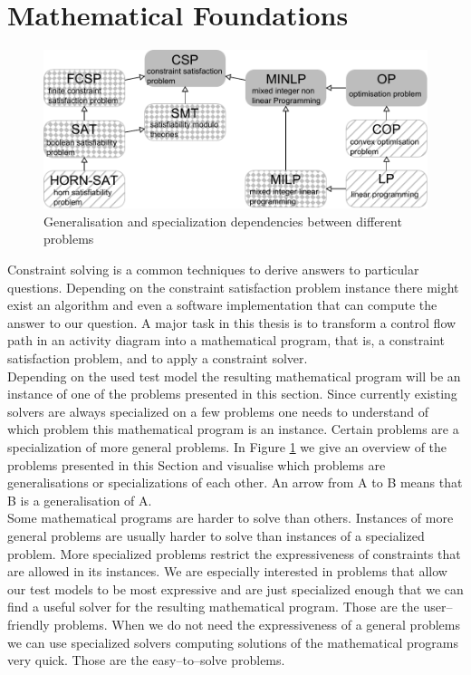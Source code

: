 \section{Mathematical Foundations}
\label{sec:Maths}
\begin{figure}
\begin{center}
\includegraphics[width=\textwidth]{./pics/ProblemLatice.pdf}
\end{center}
\caption{Generalisation and specialization dependencies between different problems}
\label{fig:problemLatice}
\end{figure}
Constraint solving is a common techniques to derive answers to particular questions. Depending on the constraint satisfaction problem instance there might exist an algorithm and even a software implementation that can compute the answer to our question. A major task in this thesis is to transform a control flow path in an activity diagram into a mathematical program, that is, a constraint satisfaction problem, and to apply a constraint solver. 
\\
Depending on the used test model the resulting mathematical program will be an instance of one of the problems presented in this section. Since currently existing solvers are always specialized on a few problems one needs to understand of which problem this mathematical program is an instance. Certain problems are a specialization of more general problems. In Figure \ref{fig:problemLatice} we give an overview of the problems presented in this Section and visualise which problems are generalisations or specializations of each other. An arrow from \textsf{A} to \textsf{B} means that \textsf{B} is a generalisation of \textsf{A}.\\
Some mathematical programs are harder to solve than others. Instances of more general problems are usually harder to solve than instances of a specialized problem. More specialized problems restrict the expressiveness of constraints that are allowed in its instances. We are especially interested in problems that allow our test models to be most expressive and are just specialized enough that we can find a useful solver for the resulting mathematical program. Those are the user--friendly problems. When we do not need the expressiveness of a general problems we can use specialized solvers computing solutions of the mathematical programs very quick. Those are the easy--to--solve problems.\\
